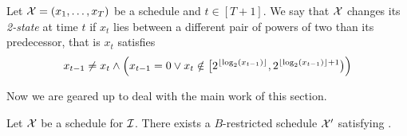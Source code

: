 \begin{defn}
Let $\mathcal{X}=(x_1,\dotsc,x_T)$ be a schedule and $t\in[T+1]$. We say that $\mathcal{X}$ changes its \emph{2-state} at time $t$ if $x_t$ lies between a different pair of powers of two than its predecessor, that is $x_t$ satisfies
\begin{equation*}
	x_{t-1}\neq x_t\land \left(x_{t-1}=0 \lor x_t\notin\bigl[2^{\lfloor\log_2(x_{t-1})\rfloor},2^{\lfloor\log_2(x_{t-1})\rfloor+1}\bigr)\right)
\end{equation*}
\end{defn}
Now we are geared up to deal with the main work of this section.
\begin{lem}\label{lem:transform_schedule_approx_2}
Let $\mathcal{X}$ be a schedule for $\mathcal{I}$. There exists a $B$-restricted schedule $\mathcal{X}'$ satisfying .
\end{lem}
